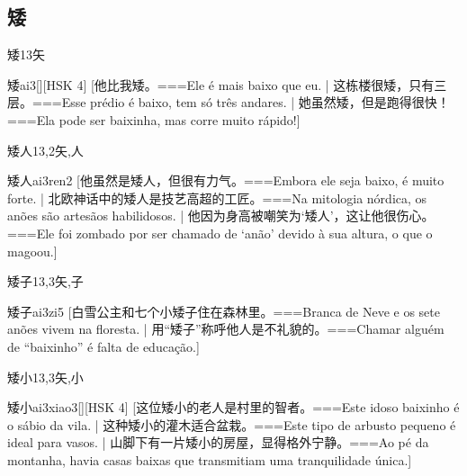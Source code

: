 \subsection*{矮}

\begin{Entry}{矮}{13}{⽮}
  \begin{Phonetics}{矮}{ai3}[][HSK 4]
    [他比我矮。===Ele é mais baixo que eu. | 这栋楼很矮，只有三层。===Esse prédio é baixo, tem só três andares. | 她虽然矮，但是跑得很快！===Ela pode ser baixinha, mas corre muito rápido!]
  \end{Phonetics}
\end{Entry}

\begin{Entry}{矮人}{13,2}{⽮,⼈}
  \begin{Phonetics}{矮人}{ai3ren2}
    [他虽然是矮人，但很有力气。===Embora ele seja baixo, é muito forte. | 北欧神话中的矮人是技艺高超的工匠。===Na mitologia nórdica, os anões são artesãos habilidosos. | 他因为身高被嘲笑为‘矮人’，这让他很伤心。===Ele foi zombado por ser chamado de ‘anão’ devido à sua altura, o que o magoou.]
  \end{Phonetics}
\end{Entry}

\begin{Entry}{矮子}{13,3}{⽮,⼦}
  \begin{Phonetics}{矮子}{ai3zi5}
    [白雪公主和七个小矮子住在森林里。===Branca de Neve e os sete anões vivem na floresta. | 用``矮子''称呼他人是不礼貌的。===Chamar alguém de ``baixinho'' é falta de educação.]
  \end{Phonetics}
\end{Entry}

\begin{Entry}{矮小}{13,3}{⽮,⼩}
  \begin{Phonetics}{矮小}{ai3xiao3}[][HSK 4]
    [这位矮小的老人是村里的智者。===Este idoso baixinho é o sábio da vila. | 这种矮小的灌木适合盆栽。===Este tipo de arbusto pequeno é ideal para vasos. | 山脚下有一片矮小的房屋，显得格外宁静。===Ao pé da montanha, havia casas baixas que transmitiam uma tranquilidade única.]
  \end{Phonetics}
\end{Entry}

